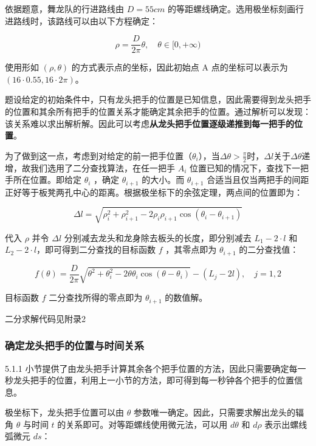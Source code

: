 \documentclass[a4paper]{article}
\begin{document}
		依据题意，舞龙队的行进路线由 $D = 55cm$ 的等距螺线确定。选用极坐标刻画行进路线时，该路线可以由以下方程确定：

		\begin{equation}
			\rho = \frac{D}{2\pi}\theta, \quad \theta \in [0,+\infty)
		\end{equation}

		使用形如 $(\rho, \theta)$ 的方式表示点的坐标，因此初始点 A 点的坐标可以表示为 $( 16 \cdot 0.55, 16 \cdot 2\pi )$。

		题设给定的初始条件中，只有龙头把手的位置是已知信息，因此需要得到龙头把手的位置和其余所有把手的位置关系才能确定其余把手的位置。通过解析可以发现：该关系难以求出解析解。因此可以考虑\textbf{从龙头把手位置逐级递推到每一把手的位置}。

		为了做到这一点，考虑到对给定的前一把手位置（$\theta_{i}$），当$\Delta \theta > \frac{\pi}{2}$时，$\Delta l$关于$\Delta \theta$递增，故我们选用了二分查找算法，在任一把手 $A_i$ 位置已知的情况下，查找下一把手所在位置。即给定 $\theta_{i}$ ，确定 $\theta_{i+1}$ 的大小。而 $\theta_{i+1}$ 合适当且仅当两把手的间距正好等于板凳两孔中心的距离。根据极坐标下的余弦定理，两点间的位置即为：

		$$\Delta l = \sqrt{\rho_i^2 + \rho_{i+1}^2 - 2\rho_i \rho_{i+1} \cos(\theta_i - \theta_{i+1})}$$

		代入 $\rho$ 并令 $\Delta l$ 分别减去龙头和龙身除去板头的长度，即分别减去 $L_1 - 2 \cdot l$ 和 $L_2 - 2 \cdot l$，即可得到二分查找的目标函数 $f$ ，其零点即为 $\theta_{i+1}$ 的二分查找值：

		\begin{equation}
			f(\theta) = \frac{D}{2\pi} \sqrt{\theta^2 + \theta_i^2 - 2\theta \theta_i \cos(\theta - \theta_i)} - (L_j - 2l), \quad j=1, 2
		\end{equation}

		目标函数 $f$ 二分查找所得的零点即为 $\theta_{i+1}$ 的数值解。

		二分求解代码见附录2 %

	\subsubsection{确定龙头把手的位置与时间关系}

		5.1.1 小节提供了由龙头把手计算其余各个把手位置的方法，因此只需要确定每一秒龙头把手的位置，利用上一小节的方法，即可得到每一秒钟各个把手的位置信息。

		极坐标下，龙头把手位置可以由 $\theta$ 参数唯一确定。因此，只需要求解出龙头的辐角 $\theta$ 与时间 $t$ 的关系即可。对等距螺线使用微元法，可以用 $d\theta$ 和 $d\rho$ 表示出螺线弧微元 $ds$：
\end{document}
